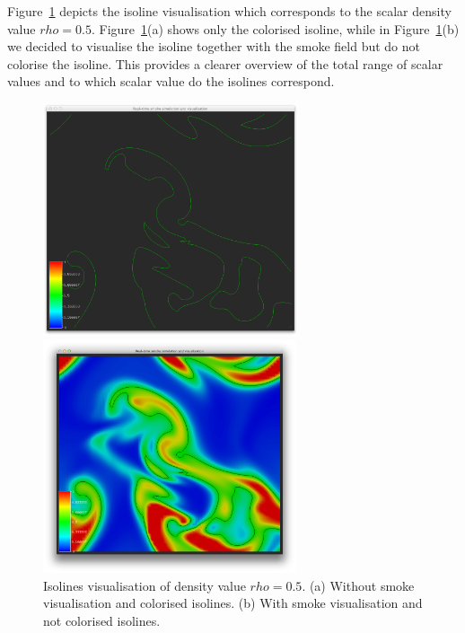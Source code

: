 Figure~\ref{fig:isoline} depicts the isoline visualisation which corresponds to the scalar density value $rho = 0.5$. Figure~\ref{fig:isoline}(a) shows only the colorised isoline, while in Figure~\ref{fig:isoline}(b) we decided to visualise the isoline together with the smoke field but do not colorise the isoline. This provides a clearer overview of the total range of scalar values and to which scalar value do the isolines correspond.

\begin{figure}[htbp]
\begin{center}
\begin{minipage}[t]{0.48\textwidth}
\includegraphics[height=2.7in]{figures/isolines/isoline.png}
\end{minipage}
\begin{minipage}[t]{0.48\textwidth}
\includegraphics[height=2.7in]{figures/isolines/isolineSmoke.png}
\end{minipage}
\caption{Isolines visualisation of density value $rho = 0.5$. (a) Without smoke visualisation and colorised isolines. (b) With smoke visualisation and not colorised isolines.}
\label{fig:isoline}
\end{center}
\end{figure}

